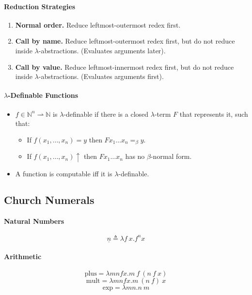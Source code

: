 \documentclass[twocolumn,english]{article}
\begin{document}
\paragraph{Reduction Strategies}
\begin{enumerate}
\item \textbf{Normal order.} Reduce leftmost-outermost redex first.
\item \textbf{Call by name.} Reduce leftmost-outermost redex first, but
do not reduce inside $\lambda$-abstractions. (Evaluates arguments
later).
\item \textbf{Call by value.} Reduce leftmost-innermost redex first, but
do not reduce inside $\lambda$-abstractions. (Evaluates arguments
first).
\end{enumerate}

\paragraph{$\lambda$-Definable Functions}
\begin{itemize}
\item $f\in\mathbb{N}^{n}\rightharpoonup\mathbb{N}$ is $\lambda$-definable
if there is a closed $\lambda$-term $F$ that represents it, such
that: 

\begin{itemize}
\item If $f\left(x_{1},\dots,x_{n}\right)=y$ then $Fx_{1}\dots x_{n}=_{\beta}y$. 
\item If $f\left(x_{1},\dots,x_{n}\right)\uparrow$ then $Fx_{1}\dots x_{n}$
has no $\beta$-normal form. 
\end{itemize}
\item A function is computable iff it is $\lambda$-definable. 
\end{itemize}

\subsection{Church Numerals}

\paragraph{Natural Numbers}
\[
\underline{n}\triangleq \lambda f\ x. f^{n}x
\]
\paragraph{Arithmetic}
\[
\text{plus}=\lambda mnfx.m\:f\:\left(n\:f\:x\right)
\]
\[
\text{mult}=\lambda mnfx.m\:\left(n\:f\right)\:x
\]
\[
\text{exp}=\lambda mn.n\:m
\]
\end{document}
